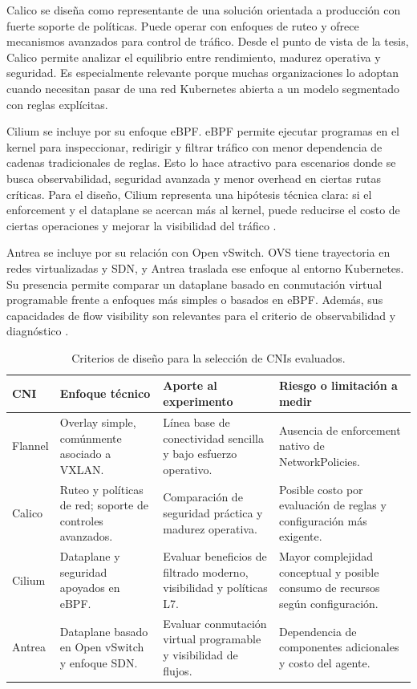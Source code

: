 Calico se diseña como representante de una solución orientada a producción con fuerte soporte de políticas. Puede operar con enfoques de ruteo y ofrece mecanismos avanzados para control de tráfico. Desde el punto de vista de la tesis, Calico permite analizar el equilibrio entre rendimiento, madurez operativa y seguridad. Es especialmente relevante porque muchas organizaciones lo adoptan cuando necesitan pasar de una red Kubernetes abierta a un modelo segmentado con reglas explícitas.

Cilium se incluye por su enfoque eBPF. eBPF permite ejecutar programas en el kernel para inspeccionar, redirigir y filtrar tráfico con menor dependencia de cadenas tradicionales de reglas. Esto lo hace atractivo para escenarios donde se busca observabilidad, seguridad avanzada y menor overhead en ciertas rutas críticas. Para el diseño, Cilium representa una hipótesis técnica clara: si el enforcement y el dataplane se acercan más al kernel, puede reducirse el costo de ciertas operaciones y mejorar la visibilidad del tráfico \cite{ref27}.

Antrea se incluye por su relación con Open vSwitch. OVS tiene trayectoria en redes virtualizadas y SDN, y Antrea traslada ese enfoque al entorno Kubernetes. Su presencia permite comparar un dataplane basado en conmutación virtual programable frente a enfoques más simples o basados en eBPF. Además, sus capacidades de flow visibility son relevantes para el criterio de observabilidad y diagnóstico \cite{ref23}.

\begin{table}[htbp]
\centering
\scriptsize
\caption{Criterios de diseño para la selección de CNIs evaluados.}
\label{tab:cni-diseno-comparativo}
\begin{tabularx}{\textwidth}{|Y|Y|Y|Y|}
\hline
\textbf{CNI} & \textbf{Enfoque técnico} & \textbf{Aporte al experimento} & \textbf{Riesgo o limitación a medir} \\
\hline
Flannel & Overlay simple, comúnmente asociado a VXLAN. & Línea base de conectividad sencilla y bajo esfuerzo operativo. & Ausencia de enforcement nativo de NetworkPolicies. \\
\hline
Calico & Ruteo y políticas de red; soporte de controles avanzados. & Comparación de seguridad práctica y madurez operativa. & Posible costo por evaluación de reglas y configuración más exigente. \\
\hline
Cilium & Dataplane y seguridad apoyados en eBPF. & Evaluar beneficios de filtrado moderno, visibilidad y políticas L7. & Mayor complejidad conceptual y posible consumo de recursos según configuración. \\
\hline
Antrea & Dataplane basado en Open vSwitch y enfoque SDN. & Evaluar conmutación virtual programable y visibilidad de flujos. & Dependencia de componentes adicionales y costo del agente. \\
\hline
\end{tabularx}
\end{table}

